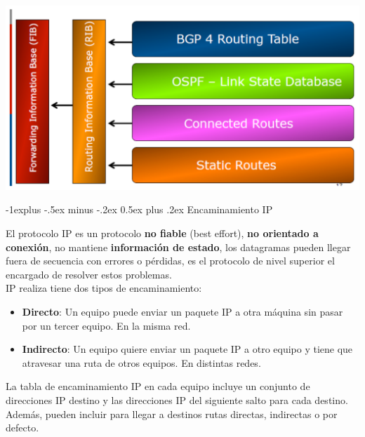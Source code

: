 \documentclass[10pt,portrait, twocolumn]{article}
\makeatletter
\renewcommand{\subsection}{\@startsection{subsection}{2}{0mm}%
                                {-1explus -.5ex minus -.2ex}%
                                {0.5ex plus .2ex}%
                                {\normalfont\normalsize\bfseries}}
\makeatother
\begin{document}
	\begin{center}
		\includegraphics[scale = .5]{FIBRIB}
	\end{center}
	
\subsection{Encaminamiento IP}

El protocolo IP es un protocolo \textbf{no fiable} (best effort), \textbf{no orientado a conexión}, no mantiene \textbf{información de estado}, los datagramas pueden llegar fuera de secuencia con errores o pérdidas, es el protocolo de nivel superior el encargado de resolver estos problemas. \\

IP realiza tiene dos tipos de encaminamiento:

	\begin{itemize}
		\item \textbf{Directo}: Un equipo puede enviar un paquete IP a otra máquina sin pasar por un tercer equipo. En la misma red.
		\item \textbf{Indirecto}: Un equipo quiere enviar un paquete IP a otro equipo y tiene que atravesar una ruta de otros equipos. En distintas redes.
	\end{itemize}

La tabla de encaminamiento IP en cada equipo incluye un conjunto de direcciones IP destino y las direcciones IP del siguiente salto para cada destino. Además, pueden incluir para llegar a destinos rutas directas, indirectas o por defecto. \\
\end{document}
